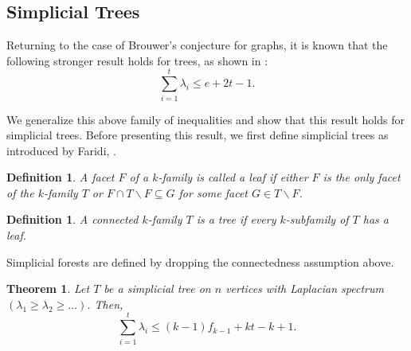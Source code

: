 \documentclass[11pt]{article}
\newtheorem{thm}[lm]{Theorem}
\newtheorem{defi}[lm]{Definition}
\begin{document}
\subsection{Simplicial Trees}

Returning to the case of Brouwer's conjecture for graphs, it is known that the following stronger result holds for trees, as shown in \cite{H}:
$$ \sum_{i = 1}^t \lambda_i \leq e + 2t - 1.$$

We generalize this above family of inequalities and show that this result holds for simplicial trees. Before presenting this result, we first define simplicial trees as introduced by Faridi, \cite{F}.

\begin{defi}
A facet $F$ of a $k$-family is called a \emph{leaf} if either $F$ is the only facet of the $k$-family $T$ or $ F \cap T \backslash F \subseteq G$ for some facet $G \in T \backslash F$.
\end{defi}

\begin{defi}
A connected $k$-family $T$ is a \emph{tree} if every $k$-subfamily of $T$ has a leaf.
\end{defi}


Simplicial forests are defined by dropping the connectedness assumption above.



\begin{thm}
Let $T$ be a simplicial tree on $n$ vertices with Laplacian spectrum $( \lambda_1 \geq \lambda_2 \geq \ldots)$. Then,
$$\sum_{i = 1}^t \lambda_i \leq (k - 1) f_{k - 1} + k t - k + 1.$$
\end{thm}
\end{document}
